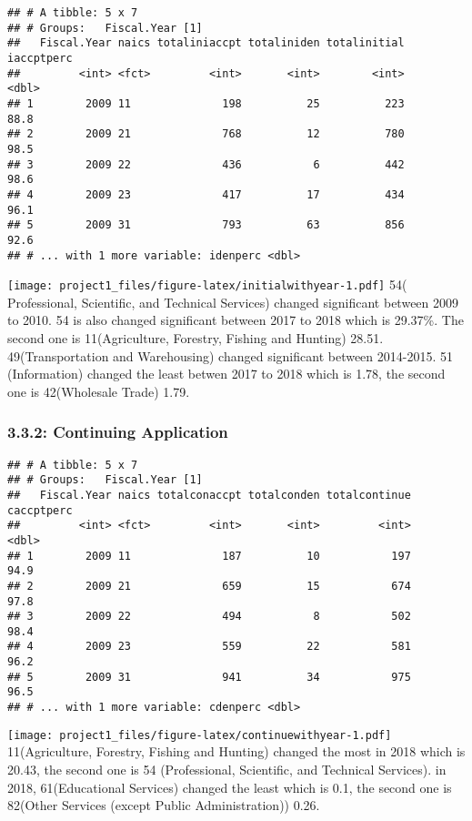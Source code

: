 \documentclass[]{article}
\begin{document}
\begin{verbatim}
## # A tibble: 5 x 7
## # Groups:   Fiscal.Year [1]
##   Fiscal.Year naics totaliniaccpt totaliniden totalinitial iaccptperc
##         <int> <fct>         <int>       <int>        <int>      <dbl>
## 1        2009 11              198          25          223       88.8
## 2        2009 21              768          12          780       98.5
## 3        2009 22              436           6          442       98.6
## 4        2009 23              417          17          434       96.1
## 5        2009 31              793          63          856       92.6
## # ... with 1 more variable: idenperc <dbl>
\end{verbatim}

\texttt{[image: project1\_files/figure-latex/initialwithyear-1.pdf]} 54(
Professional, Scientific, and Technical Services) changed significant
between 2009 to 2010. 54 is also changed significant between 2017 to
2018 which is 29.37\%. The second one is 11(Agriculture, Forestry,
Fishing and Hunting) 28.51. 49(Transportation and Warehousing) changed
significant between 2014-2015. 51 (Information) changed the least betwen
2017 to 2018 which is 1.78, the second one is 42(Wholesale Trade) 1.79.

\hypertarget{continuing-application-1}{%
\subsubsection{3.3.2: Continuing
Application}\label{continuing-application-1}}

\begin{verbatim}
## # A tibble: 5 x 7
## # Groups:   Fiscal.Year [1]
##   Fiscal.Year naics totalconaccpt totalconden totalcontinue caccptperc
##         <int> <fct>         <int>       <int>         <int>      <dbl>
## 1        2009 11              187          10           197       94.9
## 2        2009 21              659          15           674       97.8
## 3        2009 22              494           8           502       98.4
## 4        2009 23              559          22           581       96.2
## 5        2009 31              941          34           975       96.5
## # ... with 1 more variable: cdenperc <dbl>
\end{verbatim}

\texttt{[image: project1\_files/figure-latex/continuewithyear-1.pdf]}
11(Agriculture, Forestry, Fishing and Hunting) changed the most in 2018
which is 20.43, the second one is 54 (Professional, Scientific, and
Technical Services). in 2018, 61(Educational Services) changed the least
which is 0.1, the second one is 82(Other Services (except Public
Administration)) 0.26.
\end{document}
